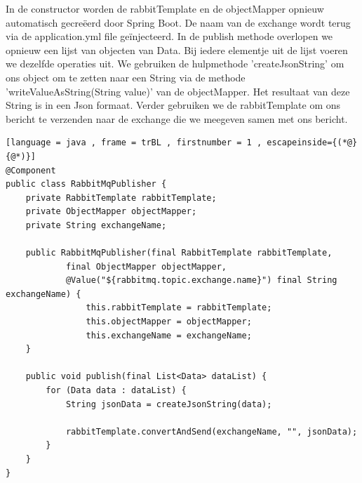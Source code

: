 In de constructor worden de rabbitTemplate en de objectMapper opnieuw automatisch gecreëerd door Spring Boot. De naam van de exchange wordt terug via de application.yml file geïnjecteerd. In de publish methode overlopen we opnieuw een lijst van objecten van Data. Bij iedere elementje uit de lijst voeren we dezelfde operaties uit. We gebruiken de hulpmethode 'createJsonString' om ons object om te zetten naar een String via de methode 'writeValueAsString(String value)' van de objectMapper. Het resultaat van deze String is in een Json formaat. Verder gebruiken we de rabbitTemplate om ons bericht te verzenden naar de exchange die we meegeven samen met ons bericht.
\begin{lstlisting}[language = java , frame = trBL , firstnumber = 1 , escapeinside={(*@}{@*)}]
@Component
public class RabbitMqPublisher {
    private RabbitTemplate rabbitTemplate;
    private ObjectMapper objectMapper;
    private String exchangeName;

    public RabbitMqPublisher(final RabbitTemplate rabbitTemplate,
            final ObjectMapper objectMapper,
            @Value("${rabbitmq.topic.exchange.name}") final String exchangeName) {
                this.rabbitTemplate = rabbitTemplate;
                this.objectMapper = objectMapper;
                this.exchangeName = exchangeName;
    }

    public void publish(final List<Data> dataList) {
        for (Data data : dataList) {
            String jsonData = createJsonString(data);

            rabbitTemplate.convertAndSend(exchangeName, "", jsonData);
        }
    }
}
\end{lstlisting}
